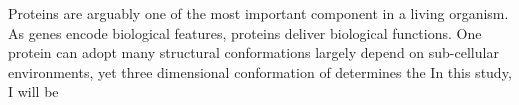 Proteins are arguably one of the most important component in a living organism. As genes encode biological features, proteins deliver biological functions. One protein can adopt many structural conformations largely depend on sub-cellular environments, yet three dimensional conformation of determines the     In this study, I will be 
